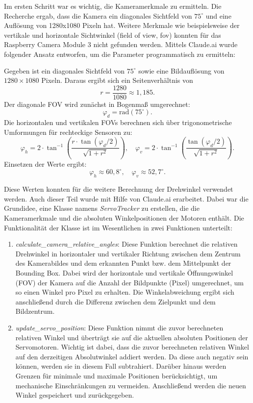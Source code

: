 Im ersten Schritt war es wichtig, die Kameramerkmale zu ermitteln. Die Recherche ergab, dass die Kamera ein diagonales Sichtfeld von $75^\circ$ und eine Auflösung von 1280x1080 Pixeln hat. Weitere Merkmale wie beispielsweise der vertikale und horizontale Sichtwinkel (field of view, fov) konnten für das Raspberry Camera Module 3 nicht gefunden werden. Mittels Claude.ai wurde folgender Ansatz entworfen, um die Parameter programmatisch zu ermitteln: \newline

Gegeben ist ein diagonales Sichtfeld von $75^\circ$ sowie eine Bildauflösung von $1280 \times 1080$ Pixeln. Daraus ergibt sich ein Seitenverhältnis von
\[
r = \frac{1280}{1080} \approx 1{,}185.
\]
Der diagonale FOV wird zunächst in Bogenmaß umgerechnet:
\[
\varphi_d = \mathrm{rad}(75^\circ).
\]
Die horizontalen und vertikalen FOVs berechnen sich über trigonometrische Umformungen für rechteckige Sensoren zu:
\[
\varphi_h = 2 \cdot \tan^{-1} \left( \frac{r \cdot \tan(\varphi_d/2)}{\sqrt{1 + r^2}} \right), \quad
\varphi_v = 2 \cdot \tan^{-1} \left( \frac{\tan(\varphi_d/2)}{\sqrt{1 + r^2}} \right).
\]
Einsetzen der Werte ergibt:
\[
\varphi_h \approx 60{,}8^\circ, \quad \varphi_v \approx 52{,}7^\circ.
\]

Diese Werten konnten für die weitere Berechnung der Drehwinkel verwendet werden. Auch dieser Teil wurde mit Hilfe von Claude.ai erarbeitet. Dabei war die Grundidee, eine Klasse namens \textit{ServoTracker} zu erstellen, die die Kameramerkmale und die absoluten Winkelpositionen der Motoren enthält. Die Funktionalität der Klasse ist im Wesentlichen in zwei Funktionen unterteilt:

\begin{enumerate}
    \item \textit{calculate\_camera\_relative\_angles}: Diese Funktion berechnet die relativen Drehwinkel in horizontaler und vertikaler Richtung zwischen dem Zentrum des Kamerabildes und dem erkannten Punkt bzw. dem Mittelpunkt der Bounding Box. Dabei wird der horizontale und vertikale Öffnungswinkel (FOV) der Kamera auf die Anzahl der Bildpunkte (Pixel) umgerechnet, um so einen Winkel pro Pixel zu erhalten. Die Winkelabweichung ergibt sich anschließend durch die Differenz zwischen dem Zielpunkt und dem Bildzentrum.
    
    \item \textit{update\_servo\_position}: Diese Funktion nimmt die zuvor berechneten relativen Winkel und überträgt sie auf die aktuellen absoluten Positionen der Servomotoren. Wichtig ist dabei, dass die zuvor berechneten relativen Winkel auf den derzeitigen Absolutwinkel addiert werden. Da diese auch negativ sein können, werden sie in diesem Fall subtrahiert. Darüber hinaus werden Grenzen für minimale und maximale Positionen berücksichtigt, um mechanische Einschränkungen zu vermeiden. Anschließend werden die neuen Winkel gespeichert und zurückgegeben.
\end{enumerate}


